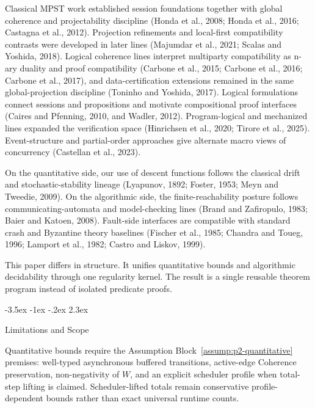 \documentclass[a4paper,10pt,twocolumn,english]{article}
\makeatletter
\renewcommand{\section}{\@startsection{section}{1}{\z@}%
  {-3.5ex \@plus -1ex \@minus -.2ex}%
  {2.3ex}%
  {\raggedright\normalfont\large\bfseries}}
\numberwithin{equation}{section}
\theoremstyle{paperdef}
\theoremstyle{paperplain}
\theoremstyle{paperdef}
\theoremstyle{paperremark}
\makeatother
\begin{document}
Classical MPST work established session foundations together with global coherence and projectability
discipline (Honda et al., 2008; Honda et al., 2016; Castagna et al., 2012). Projection refinements and local-first compatibility contrasts were developed in later lines
(Majumdar et al., 2021; Scalas and Yoshida, 2018). Logical coherence lines interpret multiparty
compatibility as n-ary duality and proof compatibility (Carbone et al., 2015; Carbone et al., 2016;
Carbone et al., 2017), and data-certification extensions remained in the same global-projection
discipline (Toninho and Yoshida, 2017). Logical formulations connect sessions and propositions and
motivate compositional proof interfaces (Caires and Pfenning, 2010, and Wadler, 2012). Program-logical
and mechanized lines expanded the verification space (Hinrichsen et al., 2020; Tirore et al., 2025). Event-structure and partial-order approaches give alternate macro views of
concurrency (Castellan et al., 2023).

On the quantitative side, our use of descent functions follows the classical drift and stochastic-stability lineage (Lyapunov, 1892; Foster, 1953; Meyn and Tweedie, 2009). On the algorithmic side, the finite-reachability posture follows communicating-automata and model-checking lines (Brand and Zafiropulo, 1983; Baier and Katoen, 2008). Fault-side interfaces are compatible with standard crash and Byzantine theory baselines (Fischer et al., 1985; Chandra and Toueg, 1996; Lamport et al., 1982; Castro and Liskov, 1999).

This paper differs in structure. It unifies quantitative bounds and algorithmic decidability through one regularity kernel. The result is a single reusable theorem program instead of isolated predicate proofs.

\section{Limitations and Scope}
\label{sec:limitations}

Quantitative bounds require the Assumption Block~\ref{assump:p2-quantitative} premises: well-typed asynchronous buffered transitions, active-edge Coherence preservation, non-negativity of $W$, and an explicit scheduler profile when total-step lifting is claimed. Scheduler-lifted totals remain conservative profile-dependent bounds rather than exact universal runtime counts.
\end{document}
